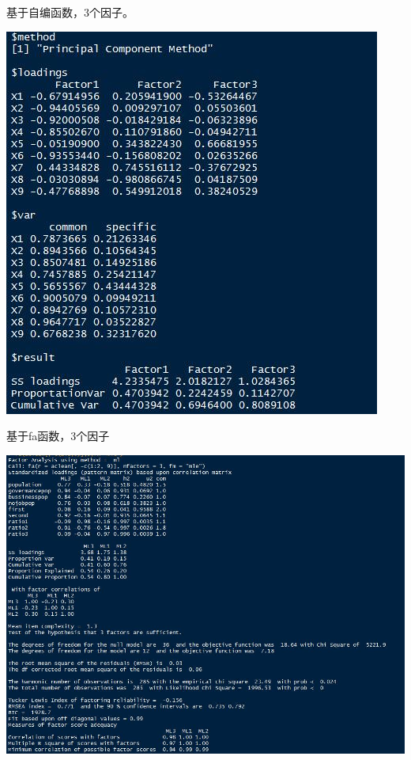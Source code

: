 \documentclass[]{ctexbook}
\begin{document}
基于自编函数，3个因子。

\includegraphics[width=0.2\linewidth,height=0.4\textheight]{fig/fig40}

基于fa函数，3个因子

\includegraphics[width=0.6\linewidth,height=0.4\textheight]{fig/fig41}
\end{document}
